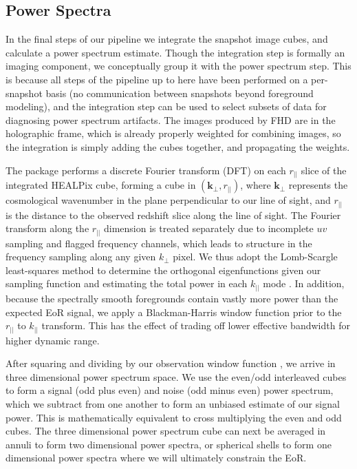\documentclass[iop]{emulateapj}
\begin{document}
\subsection{Power Spectra}
In the final steps of our pipeline we integrate the snapshot image cubes, and calculate a 
power spectrum estimate. Though the integration step is formally an imaging component, 
we conceptually group it with the power spectrum step. This is because all steps of the 
pipeline up to here have been performed on a per-snapshot basis (no communication 
between snapshots beyond foreground modeling), and the integration step can be used to 
select subsets of data for diagnosing power spectrum artifacts. The images produced by 
FHD are in the holographic frame, which is already properly weighted for combining 
images, so the integration is simply adding the cubes together, and propagating the 
weights.

The \eppsilon package performs a discrete Fourier transform (DFT) on each $r_{||}$ slice of 
the integrated HEALPix cube, forming a cube in $(\mathbf{k}_{\perp},r_{||})$, where $
\mathbf{k}_{\perp}$ represents the cosmological wavenumber in the plane perpendicular to 
our line of sight, and $r_{||}$ is the distance to the observed redshift slice along the line of 
sight. The Fourier transform along the $r_{||}$ dimension is treated separately due to 
incomplete $uv$ sampling and flagged frequency channels, which leads to structure in the 
frequency sampling along any given $k_{\perp}$ pixel. We thus adopt the Lomb-Scargle 
least-squares method to determine the orthogonal eigenfunctions given our sampling 
function and estimating the total power in each $k_{||}$ mode \citep{Scargle:1982}. In 
addition, because the spectrally smooth foregrounds contain vastly more power than the 
expected EoR signal, we apply a Blackman-Harris window function prior to the $r_{||}$ to 
$k_{||}$ transform. This has the effect of trading off lower effective bandwidth for higher 
dynamic range.

After squaring and dividing by our observation window function \citep{Bowman:2006}, we 
arrive in three dimensional power spectrum space. We use the even/odd interleaved cubes 
to form a signal (odd plus even) and noise (odd minus even) power spectrum, which we 
subtract from one another to form an unbiased estimate of our signal power. This is 
mathematically equivalent to cross multiplying the even and odd cubes. The three 
dimensional power spectrum cube can next be averaged in annuli to form two dimensional 
power spectra, or spherical shells to form one dimensional power spectra where we will 
ultimately constrain the EoR.
\end{document}
